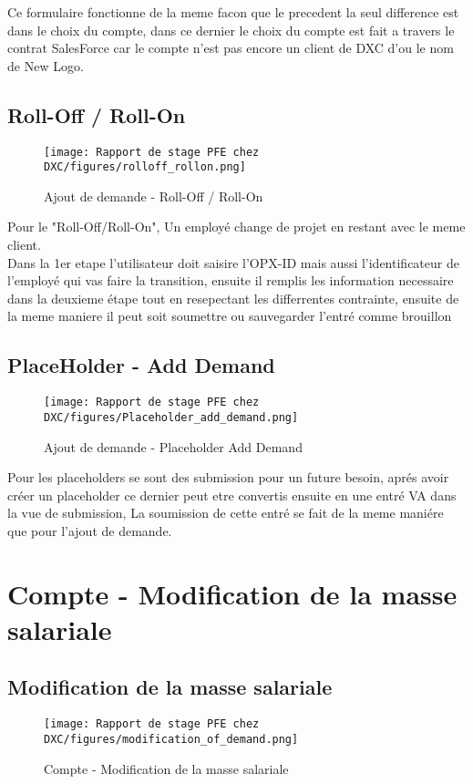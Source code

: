 Ce formulaire fonctionne de la meme facon que le precedent la seul difference est dans le choix du compte, dans ce dernier le choix du compte est fait a travers le contrat SalesForce car le compte n'est pas encore un client de DXC d'ou le nom de New Logo.

\subsection{Roll-Off / Roll-On}

\begin{figure}[H]
    \centering
    \texttt{[image: Rapport de stage PFE chez DXC/figures/rolloff\_rollon.png]}
    \caption{Ajout de demande - Roll-Off / Roll-On}
\end{figure}

Pour le "Roll-Off/Roll-On", Un employé change de projet en restant avec le meme client.
\\
Dans la 1er etape l'utilisateur doit saisire l'OPX-ID mais aussi l'identificateur de l'employé qui vas faire la transition, ensuite il remplis les information necessaire dans la deuxieme étape tout en resepectant les differrentes contrainte, ensuite de la meme maniere il peut soit soumettre ou sauvegarder l'entré comme brouillon

\subsection{PlaceHolder - Add Demand}

\begin{figure}[H]
    \centering
    \texttt{[image: Rapport de stage PFE chez DXC/figures/Placeholder\_add\_demand.png]}
    \caption{Ajout de demande - Placeholder Add Demand}
\end{figure}

Pour les placeholders se sont des submission pour un future besoin, aprés avoir créer un placeholder ce dernier peut etre convertis ensuite en une entré VA dans la vue de submission, La soumission de cette entré se fait de la meme maniére que pour l'ajout de demande. 


\section{Compte - Modification de la masse salariale}

\subsection{Modification de la masse salariale}
\begin{figure}[H]
    \centering
    \texttt{[image: Rapport de stage PFE chez DXC/figures/modification\_of\_demand.png]}
    \caption{Compte - Modification de la masse salariale}
\end{figure}

